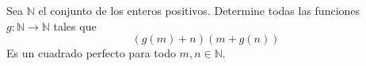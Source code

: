 Sea $\mathbb{N}$ el conjunto de los enteros positivos. Determine todas las funciones $g: \mathbb{N}\to \mathbb{N}$ tales que
\[\left(g(m)+n\right)\left(m+g(n)\right)\]
Es un cuadrado perfecto para todo $m,n\in \mathbb{N}$.